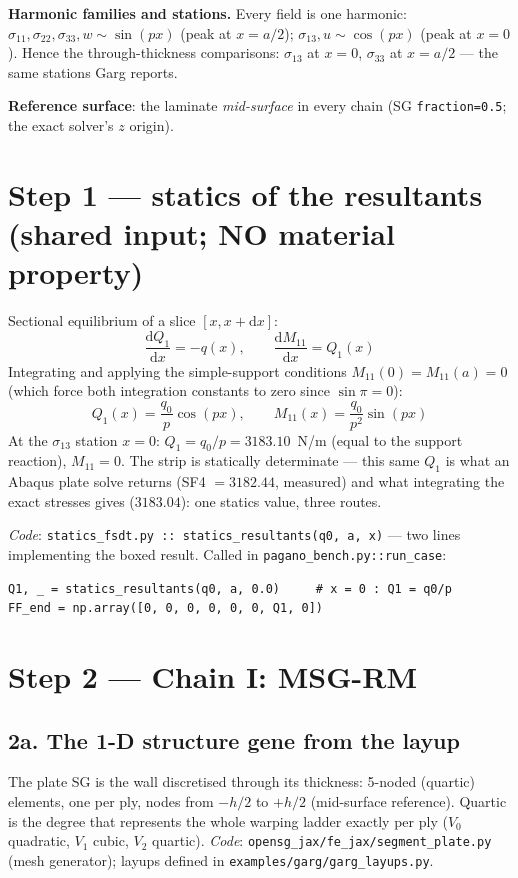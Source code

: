 \documentclass[11pt]{article}
\newcommand{\code}[1]{\texttt{#1}}
\begin{document}
\textbf{Harmonic families and stations.}  Every field is one harmonic:
$\sigma_{11},\sigma_{22},\sigma_{33},w \sim \sin(px)$ (peak at $x=a/2$);
$\sigma_{13},u \sim \cos(px)$ (peak at $x=0$).  Hence the through-thickness comparisons:
$\sigma_{13}$ at $x=0$, $\sigma_{33}$ at $x=a/2$ --- the same stations Garg reports.

\textbf{Reference surface}: the laminate \emph{mid-surface} in every chain
(SG \code{fraction=0.5}; the exact solver's $z$ origin).

\section{Step 1 --- statics of the resultants (shared input; NO material property)}

Sectional equilibrium of a slice $[x, x+\mathrm dx]$:
\begin{equation}
\frac{\mathrm dQ_1}{\mathrm dx} = -q(x), \qquad
\frac{\mathrm dM_{11}}{\mathrm dx} = Q_1(x)
\end{equation}
Integrating and applying the simple-support conditions $M_{11}(0)=M_{11}(a)=0$
(which force both integration constants to zero since $\sin \pi = 0$):
\begin{equation}
\boxed{\;Q_1(x) = \frac{q_0}{p}\cos(px), \qquad M_{11}(x) = \frac{q_0}{p^2}\sin(px)\;}
\end{equation}
At the $\sigma_{13}$ station $x=0$: $Q_1 = q_0/p = 3183.10$~N/m (equal to the support
reaction), $M_{11} = 0$.  The strip is statically determinate --- this same $Q_1$ is
what an Abaqus plate solve returns (SF4 $=3182.44$, measured) and what integrating the
exact stresses gives ($3183.04$): one statics value, three routes.

\emph{Code}: \code{statics\_fsdt.py :: statics\_resultants(q0, a, x)} --- two lines
implementing the boxed result.  Called in \code{pagano\_bench.py::run\_case}:
\begin{verbatim}
Q1, _ = statics_resultants(q0, a, 0.0)     # x = 0 : Q1 = q0/p
FF_end = np.array([0, 0, 0, 0, 0, 0, Q1, 0])
\end{verbatim}

\section{Step 2 --- Chain I: MSG-RM}

\subsection*{2a.  The 1-D structure gene from the layup}
The plate SG is the wall discretised through its thickness: 5-noded (quartic) elements,
one per ply, nodes from $-h/2$ to $+h/2$ (mid-surface reference).  Quartic is the
degree that represents the whole warping ladder exactly per ply ($V_0$ quadratic,
$V_1$ cubic, $V_2$ quartic).
\emph{Code}: \code{opensg\_jax/fe\_jax/segment\_plate.py} (mesh generator);
layups defined in \code{examples/garg/garg\_layups.py}.
\end{document}
